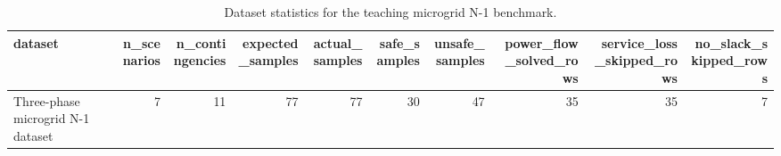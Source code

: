 \begin{table}
\caption{Dataset statistics for the teaching microgrid N-1 benchmark.}
\label{tab:dataset}
\begin{tabular}{lrrrrrrrrr}
\toprule
dataset & n_scenarios & n_contingencies & expected_samples & actual_samples & safe_samples & unsafe_samples & power_flow_solved_rows & service_loss_skipped_rows & no_slack_skipped_rows \\
\midrule
Three-phase microgrid N-1 dataset & 7 & 11 & 77 & 77 & 30 & 47 & 35 & 35 & 7 \\
\bottomrule
\end{tabular}
\end{table}
